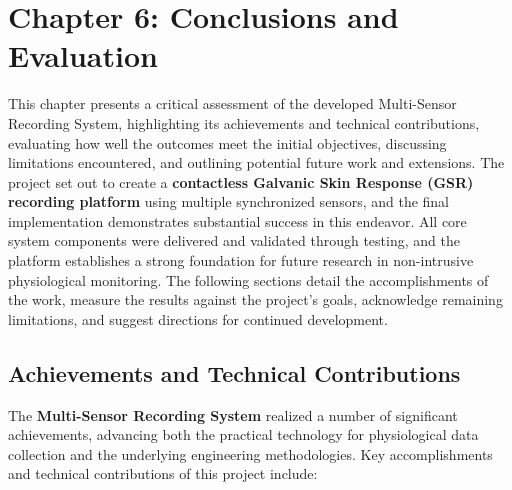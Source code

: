 \documentclass[11pt,a4paper]{report}
\begin{document}
\label{chap:6}

\chapter{Chapter 6: Conclusions and Evaluation}

This chapter presents a critical assessment of the developed
Multi-Sensor Recording System, highlighting its achievements and
technical contributions, evaluating how well the outcomes meet the
initial objectives, discussing limitations encountered, and outlining
potential future work and extensions. The project set out to create a
\textbf{contactless Galvanic Skin Response (GSR) recording platform} using
multiple synchronized sensors, and the final implementation demonstrates
substantial success in this endeavor. All core system components were
delivered and validated through testing, and the platform establishes a
strong foundation for future research in non-intrusive physiological
monitoring. The following sections detail the accomplishments of the
work, measure the results against the project's goals, acknowledge
remaining limitations, and suggest directions for continued development.

\section{Achievements and Technical Contributions}

The \textbf{Multi-Sensor Recording System} realized a number of significant
achievements, advancing both the practical technology for physiological
data collection and the underlying engineering methodologies. Key
accomplishments and technical contributions of this project include:
\end{document}
